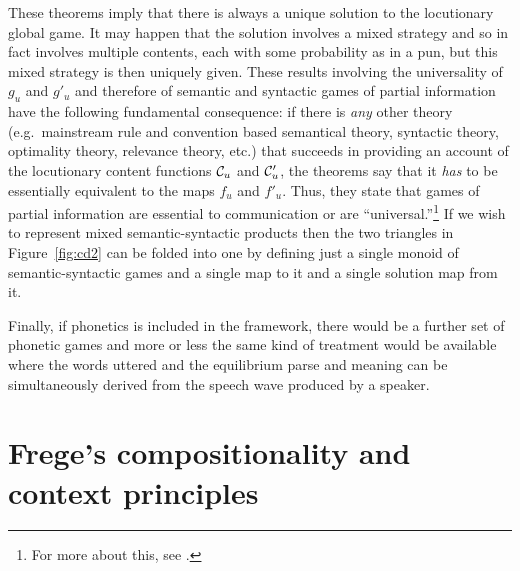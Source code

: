 These theorems imply that there is always a unique solution to the locutionary global game. It may happen that the solution involves a mixed strategy and so in fact involves multiple contents, each with some probability as in a pun, but this mixed strategy is then uniquely given. These results involving the universality of $g_u$ and $g'_u$ and therefore of semantic and syntactic games of partial information have the following fundamental consequence: if there is \emph{any} other theory (e.g.\ mainstream rule and convention based semantical theory, syntactic theory, optimality theory, relevance theory, etc.) that succeeds in providing an account of the locutionary content functions ${\cal C}_u$ and ${\cal C}'_u$, the theorems say that it \emph{has} to be essentially equivalent to the maps $f_u$ and $f'_u$. Thus, they state that games of partial information are essential to communication or are ``universal.''\footnote{For more about this, see \citet[Section~4.11]{parikh:le}.} If we wish to represent mixed semantic-syntactic products then the two triangles in Figure~\ref{fig:cd2} can be folded into one by defining just a single monoid of semantic-syntactic games and a single map to it and a single solution map from it. 

Finally, if phonetics is included in the framework, there would be a further set of phonetic games and more or less the same kind of treatment would be available where the words uttered and the equilibrium parse and meaning can be simultaneously derived from the speech wave produced by a speaker.


\section{Frege's compositionality and context principles} \label{sec:compositionality/context}

